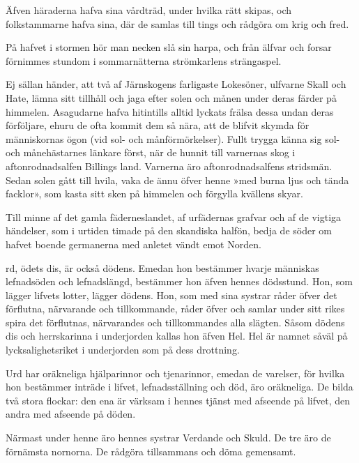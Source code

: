 Äfven häraderna hafva sina vårdträd, under hvilka rätt skipas, och
folkstammarne hafva sina, där de samlas till tings och rådgöra om krig
och fred.

På hafvet i stormen hör man necken slå sin harpa, och från älfvar och
forsar förnimmes stundom i sommarnätterna strömkarlens strängaspel.

Ej sällan händer, att två af Järnskogens farligaste Lokesöner, ulfvarne
Skall och Hate, lämna sitt tillhåll och jaga efter solen och månen under
deras färder på himmelen. Asagudarne hafva hitintills alltid lyckats
frälsa dessa undan deras förföljare, ehuru de ofta kommit dem så nära,
att de blifvit skymda för människornas ögon (vid sol- och
månförmörkelser). Fullt trygga känna sig sol- och månehästarnes länkare
först, när de hunnit till varnernas skog i aftonrodnadsalfen Billings
land. Varnerna äro aftonrodnadsalfens stridsmän. Sedan solen
gått till hvila, vaka de ännu öfver henne »med burna ljus och tända
facklor», som kasta sitt sken på himmelen och förgylla kvällens skyar.

Till minne af det gamla fäderneslandet, af urfädernas grafvar och af de
vigtiga händelser, som i urtiden timade på den skandiska halfön, bedja
de söder om hafvet boende germanerna med anletet vändt emot Norden.

\endSecII


\dropcapU rd, ödets dis, är också dödens. Emedan hon bestämmer hvarje människas
lefnadsöden och lefnadslängd, bestämmer hon äfven hennes dödsstund. Hon,
som lägger lifvets lotter, lägger dödens. Hon, som med sina systrar
råder öfver det förflutna, närvarande och tillkommande, råder öfver och
samlar under sitt rikes spira det förflutnas, närvarandes och
tillkommandes alla slägten. Såsom dödens dis och herrskarinna i
underjorden kallas hon äfven Hel. Hel är namnet såväl på
lycksalighetsriket i underjorden som på dess drottning.

Urd har oräkneliga hjälparinnor och tjenarinnor, emedan de varelser, för
hvilka hon bestämmer inträde i lifvet, lefnadsställning och död, äro
oräkneliga. De bilda två stora flockar: den ena är värksam i hennes
tjänst med afseende på lifvet, den andra med afseende på döden.

Närmast under henne äro hennes systrar Verdande och Skuld. De tre äro de
förnämsta nornorna. De rådgöra tillsammans och döma gemensamt.

